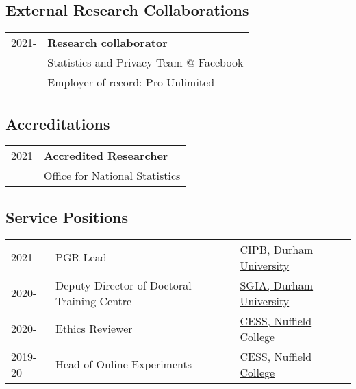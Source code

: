\documentclass[11pt, a4paper]{article}
\begin{document}
\subsection*{External Research Collaborations}


\begin{tabular}{p{}l}
    2021- & \textbf{Research collaborator} \\
    & Statistics and Privacy Team @ Facebook\\
    & Employer of record: Pro Unlimited\\    

 \end{tabular}

 \subsection*{Accreditations}

 \begin{tabular}{p{}l}
   2021 & \textbf{Accredited Researcher} \\
    & Office for National Statistics \\
   
 \end{tabular}

 \subsection*{Service Positions}

 \begin{tabular}{p{}ll}
   2021- & PGR Lead & \href{https://www.durham.ac.uk/research/institutes-and-centres/institutions-political-behaviour/}{CIPB, Durham University} \\
   2020- & Deputy Director of Doctoral Training Centre & \href{https://www.durham.ac.uk/departments/academic/school-government-international-affairs/}{SGIA, Durham University}\\
   2020- & Ethics Reviewer & \href{https://cess-nuffield.nuff.ox.ac.uk/}{CESS, Nuffield College} \\
   2019-20 & Head of Online Experiments & \href{https://cess-nuffield.nuff.ox.ac.uk/}{CESS, Nuffield College} \\
   
 \end{tabular}

 


\end{document}
